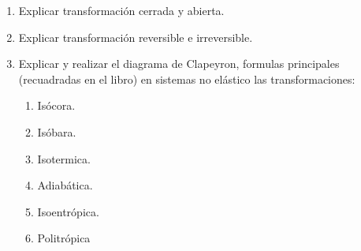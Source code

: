 \documentclass[../main]{subfiles}
\begin{document}
\begin{enumerate}
  \item Explicar transformación cerrada y abierta.
  \item Explicar transformación reversible e irreversible.
  \item Explicar y realizar el diagrama de Clapeyron, formulas
    principales (recuadradas en el libro) en sistemas no elástico las
    transformaciones:
    \begin{enumerate}
      \item Isócora.
      \item Isóbara.
      \item Isotermica.
      \item Adiabática.
      \item Isoentrópica.
      \item Politrópica
    \end{enumerate}
\end{enumerate}
\end{document}
